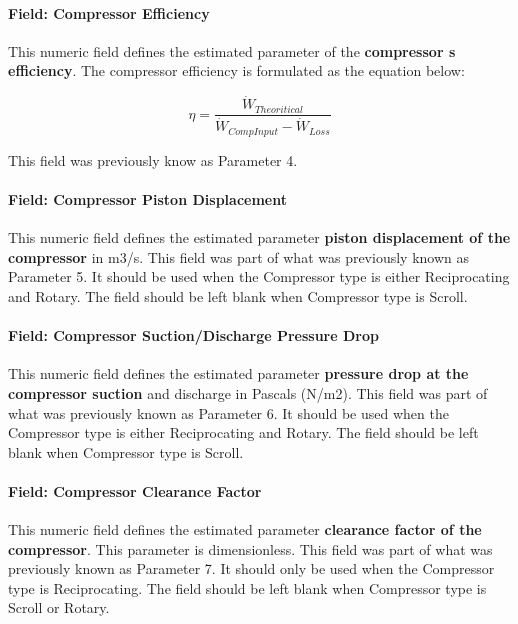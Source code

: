 \paragraph{Field: Compressor Efficiency}\label{field-compressor-efficiency-1}

This numeric field defines the estimated parameter of the \textbf{compressor s efficiency}. The compressor efficiency is formulated as the equation below:

\begin{equation}
\eta  = \frac{{{{\dot W}_{Theoritical}}}}{{{{\dot W}_{CompInput}} - {{\dot W}_{Loss}}}}
\end{equation}

This field was previously know as Parameter 4.

\paragraph{Field: Compressor Piston Displacement}\label{field-compressor-piston-displacement-1}

This numeric field defines the estimated parameter \textbf{piston displacement of the compressor} in m3/s. This field was part of what was previously known as Parameter 5. It should be used when the Compressor type is either Reciprocating and Rotary. The field should be left blank when Compressor type is Scroll.

\paragraph{Field: Compressor Suction/Discharge Pressure Drop}\label{field-compressor-suctiondischarge-pressure-drop-1}

This numeric field defines the estimated parameter \textbf{pressure drop at the compressor suction} and discharge in Pascals (N/m2). This field was part of what was previously known as Parameter 6. It should be used when the Compressor type is either Reciprocating and Rotary. The field should be left blank when Compressor type is Scroll.

\paragraph{Field: Compressor Clearance Factor}\label{field-compressor-clearance-factor-1}

This numeric field defines the estimated parameter \textbf{clearance factor of the compressor}. This parameter is dimensionless. This field was part of what was previously known as Parameter 7. It should only be used when the Compressor type is Reciprocating. The field should be left blank when Compressor type is Scroll or Rotary.


